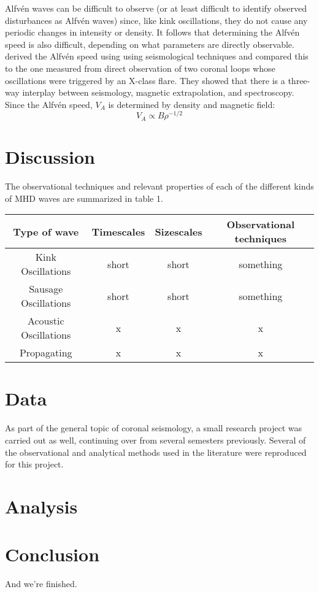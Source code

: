 \documentclass[preprint2]{aastex}
\begin{document}
Alfv\'en waves can be difficult to observe (or at least difficult to
identify observed disturbances as Alfv\'en waves) since, like kink
oscillations, they do not cause any periodic changes in intensity or density.
It follows that determining the Alfv\'en speed is also difficult,
depending on what parameters are directly observable.
\cite{tor_2} derived the Alfv\'en speed using using seismological techniques
and compared this to the one measured from direct observation of two
coronal loops whose oscillations were triggered by an X-class flare.
They showed that there is a three-way interplay between seismology,
magnetic extrapolation, and spectroscopy. Since the Alfv\'en speed, $V_A$
is determined by density and magnetic field:
\begin{equation}
    V_A \propto B\rho^{-1/2}
\end{equation}


\section{Discussion}\label{disc}
The observational techniques and relevant properties of each of the different
kinds of MHD waves are summarized in table 1.
\begin{table*}[ht]
    \centering
    \begin{tabular}{c c c c}
        \hline\hline
        Type of wave &
        Timescales &
        Sizescales &
        Observational techniques\\
        \hline
        Kink Oscillations & short & short & something\\
        Sausage Oscillations & short & short & something\\
        Acoustic Oscillations & x & x & x\\
        Propagating & x & x & x\\
        \hline\hline
    \end{tabular}
\end{table*}

\section{Data}\label{data}
As part of the general topic of coronal seismology,
a small research project was carried out as well, continuing
over from several semesters previously. Several of the observational
and analytical methods used in the literature were reproduced for
this project.

\section{Analysis}\label{analysis}

\section{Conclusion}\label{conclusion}
And we're finished.


\end{document}
